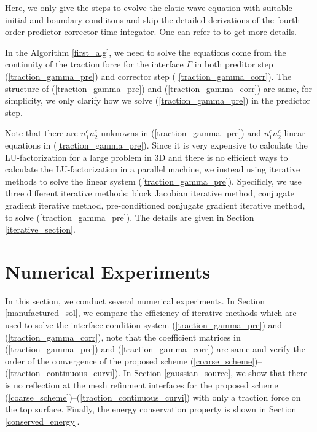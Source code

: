 \documentclass[a4paper]{article}
\begin{document}
Here, we only give the steps to evolve the elatic wave equation with suitable initial and boundary condiitons and skip the detailed derivations of the fourth order predictor corrector time integator. One can refer to \cite{?} to get more details.

In the Algorithm \ref{first_alg}, we need to solve the equations come from the continuity of the traction force for the interface $\Gamma$ in both preditor step (\ref{traction_gamma_pre}) and corrector step (
\ref{traction_gamma_corr}). The structure of (\ref{traction_gamma_pre}) and (\ref{traction_gamma_corr}) are same, for simplicity, we only clarify how we solve (\ref{traction_gamma_pre}) in the predictor step.

Note that there are $n_1^cn_2^c$ unknowns in (\ref{traction_gamma_pre}) and $n_1^cn_2^c$ linear equations in (\ref{traction_gamma_pre}). Since it is very expensive to calculate the LU-factorization for a large problem in $3$D and there is no efficient ways to calculate the LU-factorization in a parallel machine, we instead using iterative methods to solve the linear system (\ref{traction_gamma_pre}). Specificly, we use three different iterative methods: block Jacobian iterative method, conjugate gradient iterative method, pre-conditioned conjugate gradient iterative method, to solve (\ref{traction_gamma_pre}). The details are given in Section \ref{iterative_section}.

\section{Numerical Experiments}
In this section, we conduct several numerical experiments. In Section \ref{manufactured_sol}, we compare the efficiency of iterative methods which are used to solve the interface condition system (\ref{traction_gamma_pre}) and (\ref{traction_gamma_corr}), note that the coefficient matrices in (\ref{traction_gamma_pre}) and (\ref{traction_gamma_corr}) are same and verify the order of the convergence of the proposed scheme (\ref{coarse_scheme})--(\ref{traction_continuous_curvi}). In Section \ref{gaussian_source}, we show that there is no reflection at the mesh refinment interfaces for the proposed scheme (\ref{coarse_scheme})--(\ref{traction_continuous_curvi}) with only a traction force on the top surface. Finally, the energy conservation property is shown in Section \ref{conserved_energy}.
\end{document}
